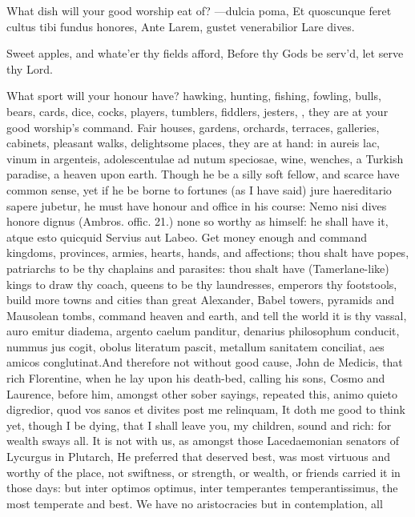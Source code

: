 {What dish will your good worship eat of?
---dulcia poma,
Et quoscunque feret cultus tibi fundus honores,
Ante Larem, gustet venerabilior Lare dives.

Sweet apples, and whate'er thy fields afford,
Before thy Gods be serv'd, let serve thy Lord.

What sport will your honour have? hawking, hunting, fishing, fowling,
bulls, bears, cards, dice, cocks, players, tumblers, fiddlers, jesters,
\etc{}, they are at your good worship's command. Fair houses, gardens,
orchards, terraces, galleries, cabinets, pleasant walks, delightsome
places, they are at hand: in aureis lac, vinum in argenteis,
adolescentulae ad nutum speciosae, wine, wenches, \etc{} a Turkish
paradise, a heaven upon earth. Though he be a silly soft fellow, and
scarce have common sense, yet if he be borne to fortunes (as I have
said) jure haereditario sapere jubetur, he must have honour and
office in his course: Nemo nisi dives honore dignus (Ambros.
offic. 21.) none so worthy as himself: he shall have it, atque esto
quicquid Servius aut Labeo. Get money enough and command
kingdoms, provinces, armies, hearts, hands, and affections; thou
shalt have popes, patriarchs to be thy chaplains and parasites: thou
shalt have (Tamerlane-like) kings to draw thy coach, queens to be thy
laundresses, emperors thy footstools, build more towns and cities than
great Alexander, Babel towers, pyramids and Mausolean tombs, \etc{}
command heaven and earth, and tell the world it is thy vassal, auro
emitur diadema, argento caelum panditur, denarius philosophum conducit,
nummus jus cogit, obolus literatum pascit, metallum sanitatem
conciliat, aes amicos conglutinat.And therefore not without good
cause, John de Medicis, that rich Florentine, when he lay upon his
death-bed, calling his sons, Cosmo and Laurence, before him, amongst
other sober sayings, repeated this, animo quieto digredior, quod vos
sanos et divites post me relinquam, It doth me good to think yet,
though I be dying, that I shall leave you, my children, sound and rich:
for wealth sways all. It is not with us, as amongst those Lacedaemonian
senators of Lycurgus in Plutarch, He preferred that deserved best, was
most virtuous and worthy of the place, not swiftness, or
strength, or wealth, or friends carried it in those days: but inter
optimos optimus, inter temperantes temperantissimus, the most temperate
and best. We have no aristocracies but in contemplation, all
}
